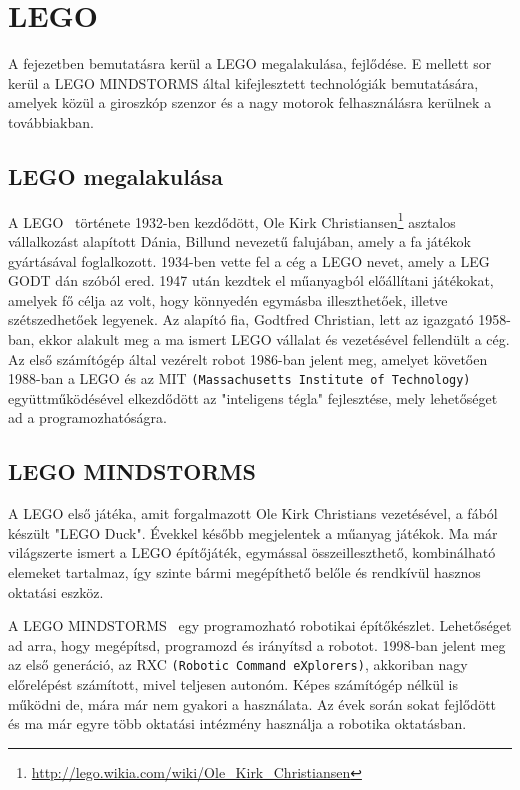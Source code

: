 \chapter{LEGO} \label{ch:ROBOT}

\begin{osszefoglal}
A fejezetben bemutatásra kerül a LEGO megalakulása, fejlődése. E mellett sor kerül a LEGO MINDSTORMS által kifejlesztett technológiák bemutatására, amelyek közül a giroszkóp szenzor és a nagy motorok felhasználásra kerülnek a továbbiakban.
\end{osszefoglal}

\section{LEGO megalakulása}\label{sec:ROBOT:lego}
A LEGO~\cite{lego} története 1932-ben kezdődött, Ole Kirk Christiansen\footnote{\href {http://lego.wikia.com/wiki/Ole\_Kirk\_Christiansen}{http://lego.wikia.com/wiki/Ole\_Kirk\_Christiansen}} asztalos vállalkozást alapított Dánia, Billund nevezetű falujában, amely a fa játékok gyártásával foglalkozott. 1934-ben vette fel a cég a LEGO nevet, amely a LEG GODT dán szóból ered. 1947 után kezdtek el műanyagból előállítani játékokat, amelyek fő célja az volt, hogy könnyedén egymásba illeszthetőek, illetve szétszedhetőek legyenek. Az alapító fia, Godtfred Christian, lett az igazgató 1958-ban, ekkor alakult meg a ma ismert LEGO vállalat és vezetésével fellendült a cég. Az első számítógép által vezérelt robot 1986-ban jelent meg, amelyet követően 1988-ban a LEGO és az MIT \texttt{(Massachusetts Institute of Technology)} együttműködésével elkezdődött az "inteligens tégla" fejlesztése, mely lehetőséget ad a programozhatóságra.

\section{LEGO MINDSTORMS}\label{sec:ROBOT:mindstorms}
A LEGO  első játéka, amit forgalmazott Ole Kirk Christians vezetésével, a fából készült "LEGO Duck". Évekkel később megjelentek a műanyag játékok. Ma már világszerte ismert a LEGO építőjáték, egymással összeilleszthető, kombinálható elemeket tartalmaz, így szinte bármi megépíthető belőle és rendkívül hasznos oktatási eszköz. 

A LEGO MINDSTORMS~\cite{mindstormsHistory} egy programozható robotikai építőkészlet. Lehetőséget ad arra, hogy megépítsd, programozd és irányítsd a robotot.
1998-ban jelent meg az első generáció, az RXC \texttt{(Robotic Command eXplorers)}, akkoriban nagy előrelépést számított, mivel teljesen autonóm. Képes számítógép nélkül is működni de, mára már nem gyakori a használata. Az évek során sokat fejlődött és ma már egyre több oktatási intézmény használja a robotika oktatásban.


